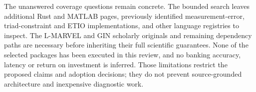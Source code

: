 The unanswered coverage questions remain concrete. The bounded search
leaves additional Rust and MATLAB pages, previously identified
measurement-error, triad-constraint and ETIO implementations, and other
language registries to inspect. The L-MARVEL and GIN scholarly originals
and remaining dependency paths are necessary before inheriting their
full scientific guarantees. None of the selected packages has been
executed in this review, and no banking accuracy, latency or return on
investment is inferred. Those limitations restrict the proposed claims
and adoption decisions; they do not prevent source-grounded architecture
and inexpensive diagnostic work. \citep{exec14_olatent_search}

\label{exec14:other-latent-end}
